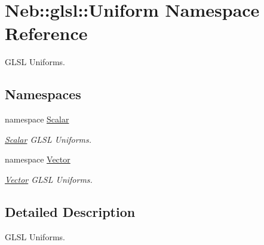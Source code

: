 \hypertarget{namespaceNeb_1_1glsl_1_1Uniform}{\section{\-Neb\-:\-:glsl\-:\-:\-Uniform \-Namespace \-Reference}
\label{namespaceNeb_1_1glsl_1_1Uniform}
}


\-G\-L\-S\-L \-Uniforms.  


\subsection*{\-Namespaces}
\begin{DoxyCompactItemize}
\item 
namespace \hyperlink{namespaceNeb_1_1glsl_1_1Uniform_1_1Scalar}{\-Scalar}
\begin{DoxyCompactList}\small\item\em \hyperlink{namespaceNeb_1_1glsl_1_1Uniform_1_1Scalar}{\-Scalar} \-G\-L\-S\-L \-Uniforms. \end{DoxyCompactList}\item 
namespace \hyperlink{namespaceNeb_1_1glsl_1_1Uniform_1_1Vector}{\-Vector}
\begin{DoxyCompactList}\small\item\em \hyperlink{namespaceNeb_1_1glsl_1_1Uniform_1_1Vector}{\-Vector} \-G\-L\-S\-L \-Uniforms. \end{DoxyCompactList}\end{DoxyCompactItemize}


\subsection{\-Detailed \-Description}
\-G\-L\-S\-L \-Uniforms. 